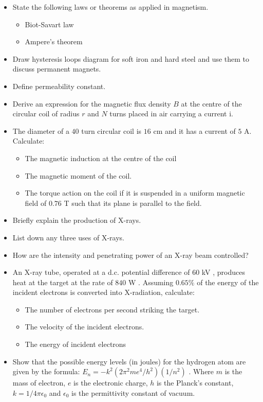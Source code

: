 \documentclass{article}
\begin{document}
\begin{itemize}
\item State the following laws or theorems as applied in magnetism.
 \begin{itemize}
\item Biot-Savart law
\item Ampere’s theorem
\end{itemize}
\item Draw hysteresis loops diagram for soft iron and hard steel and use them to discuss permanent magnets.
\item Define permeability constant.
\item Derive an expression for the magnetic flux density $ B$ at the centre of the circular coil of radius $ r$ and $ N$ turns placed in air carrying a current i.
\item The diameter of a $ 40$ turn circular coil is $ 16$ cm and it has a current of $ 5$ A.  Calculate:
 \begin{itemize}
\item The magnetic induction at the centre of the coil
\item The magnetic moment of the coil.
\item The torque action on the coil if it is suspended in a uniform magnetic field of $ 0.76$ T such that its plane is parallel to the field.
\end{itemize}
\item Briefly explain the production of X-rays.
\item List down any three uses of X-rays.
\item How are the intensity and penetrating power of an X-ray beam controlled?
\item An X-ray tube, operated at a d.c. potential difference of $ 60$ kV , produces heat at the target at the rate of $ 840$ W .  Assuming $ 0.65\%$ of the energy of the incident electrons is converted into X-radiation, calculate:
 \begin{itemize}
\item The number of electrons per second striking the target.
\item The velocity of the incident electrons.
\item The energy of incident electrons
\end{itemize}
\item Show that the possible energy levels (in joules) for the hydrogen atom are given by the formula: $ E_{n}=-k^{2}(2\pi^{2}me^{4}/h^{2})(1/n^{2})$ .  Where $ m$ is the mass of electron, $ e$ is the electronic charge, $ h$ is the Planck’s constant, $ k=1/4\pi\epsilon _{0}$ and $ \epsilon _{0}$ is the permittivity constant of vacuum.  

\end{itemize}
\end{document}
